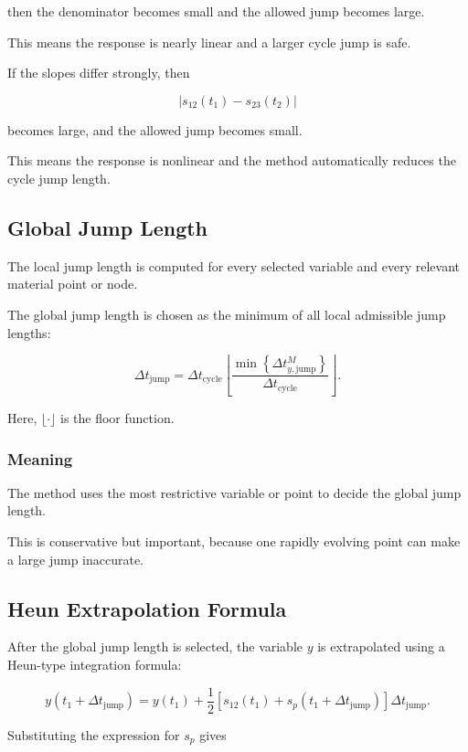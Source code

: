 ﻿\documentclass[11pt,a4paper]{article}
\begin{document}
then the denominator becomes small and the allowed jump becomes large.

This means the response is nearly linear and a larger cycle jump is safe.

If the slopes differ strongly, then

\[
\left|s_{12}(t_1)-s_{23}(t_2)\right|
\]

becomes large, and the allowed jump becomes small.

This means the response is nonlinear and the method automatically reduces the cycle jump length.

\subsection{Global Jump Length}

The local jump length is computed for every selected variable and every relevant material point or node.

The global jump length is chosen as the minimum of all local admissible jump lengths:

\[
\Delta t_{\mathrm{jump}}
=
\Delta t_{\mathrm{cycle}}
\left\lfloor
\frac{
\min\left\{\Delta t^M_{y,\mathrm{jump}}\right\}
}{
\Delta t_{\mathrm{cycle}}
}
\right\rfloor.
\]

Here, $\lfloor \cdot \rfloor$ is the floor function.

\subsubsection*{Meaning}

The method uses the most restrictive variable or point to decide the global jump length.

This is conservative but important, because one rapidly evolving point can make a large jump inaccurate.

\subsection{Heun Extrapolation Formula}

After the global jump length is selected, the variable $y$ is extrapolated using a Heun-type integration formula:

\[
y(t_1+\Delta t_{\mathrm{jump}})
=
y(t_1)
+
\frac{1}{2}
\left[
s_{12}(t_1)
+
s_p(t_1+\Delta t_{\mathrm{jump}})
\right]
\Delta t_{\mathrm{jump}}.
\]

Substituting the expression for $s_p$ gives
\end{document}
